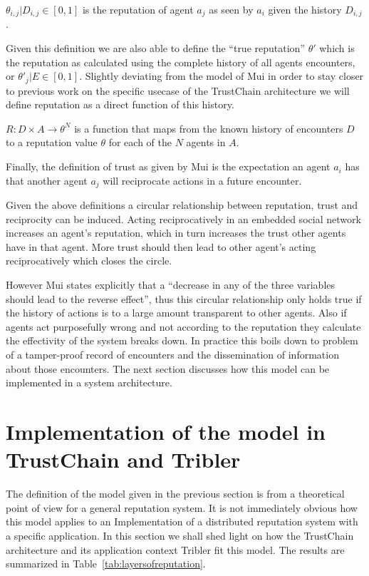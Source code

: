 \begin{defn}[Reputation]
    $\theta_{i,j} | D_{i,j} \in [ 0, 1 ]$ is the reputation of agent $a_j$ as seen by $a_i$ given
    the history $D_{i,j}$. 
\end{defn}

Given this definition we are also able to define the ``true reputation'' $\theta'$ which is the reputation 
as calculated using the complete history of all agents encounters, or $\theta'_j | E \in [ 0,1]$.
Slightly deviating from the model of Mui in order to stay closer to previous work on the specific usecase of 
the TrustChain architecture we will define reputation as a direct function of this history.

\begin{defn}
    $R: D \times A \rightarrow \theta^N$ is a function that maps from the known history of encounters $D$ to a
    reputation value $\theta$ for each of the $N$ agents in $A$.
\end{defn}

Finally, the definition of trust as given by Mui is the expectation an agent $a_i$ has that another 
agent $a_j$ will reciprocate actions in a future encounter.

Given the above definitions a circular relationship between reputation, trust and reciprocity can be
induced. Acting reciprocatively in an embedded social network increases an agent's reputation, which 
in turn increases the trust other agents have in that agent. More trust should then lead to other 
agent's acting reciprocatively which closes the circle. 

However Mui states explicitly that a ``decrease in any of the three variables should lead to the 
reverse effect'', thus this circular relationship only holds true if the history of actions is to a 
large amount transparent to other agents. Also if agents act purposefully wrong and not according
to the reputation they calculate the effectivity of the system breaks down. In practice this boils 
down to problem of a tamper-proof record of encounters and the dissemination of information about 
those encounters. The next section discusses how this model can be implemented in a system
architecture.

\section{Implementation of the model in TrustChain and Tribler}
The definition of the model given in the previous section is from a theoretical point of view for a
general reputation system. It is not immediately obvious how this model applies to an Implementation
of a distributed reputation system with a specific application. In this section we shall shed light
on how the TrustChain architecture and its application context Tribler fit this model. The results
are summarized in Table~\ref{tab:layersofreputation}. 

